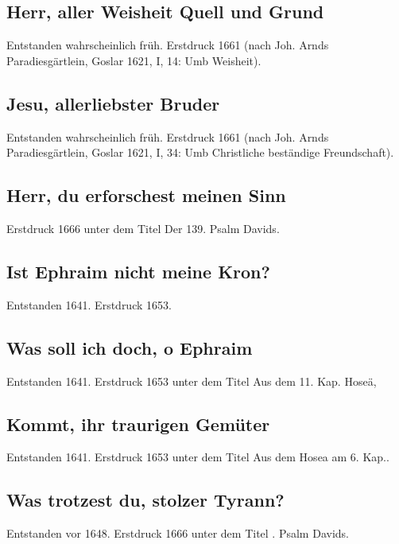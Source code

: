 \subsection*{ Herr, aller Weisheit Quell und Grund}

Entstanden wahrscheinlich früh. Erstdruck 1661 (nach Joh. Arnds
\frqq Paradiesgärtlein\flqq , Goslar 1621, I, 14: \frqq Umb Weisheit\flqq ).

\subsection*{ Jesu, allerliebster Bruder}

Entstanden wahrscheinlich früh. Erstdruck 1661 (nach Joh. Arnds
\frqq Paradiesgärtlein\flqq , Goslar 1621, I, 34: \frqq Umb Christliche beständige
Freundschaft\flqq ).

\subsection*{ Herr, du erforschest meinen Sinn}

Erstdruck 1666 unter dem Titel \frqq Der 139. Psalm Davids\flqq .

\subsection*{ Ist Ephraim nicht meine Kron?}

Entstanden 1641. Erstdruck 1653.

\subsection*{ Was soll ich doch, o Ephraim}

Entstanden 1641. Erstdruck 1653 unter dem Titel \frqq Aus dem 11. Kap.
Hoseä\flqq ,

\subsection*{ Kommt, ihr traurigen Gemüter}

Entstanden 1641. Erstdruck 1653 unter dem Titel \frqq Aus dem Hosea am 6.
Kap.\flqq .

\subsection*{ Was trotzest du, stolzer Tyrann?}

Entstanden vor 1648. Erstdruck 1666 unter dem Titel . Psalm Davids\flqq .

